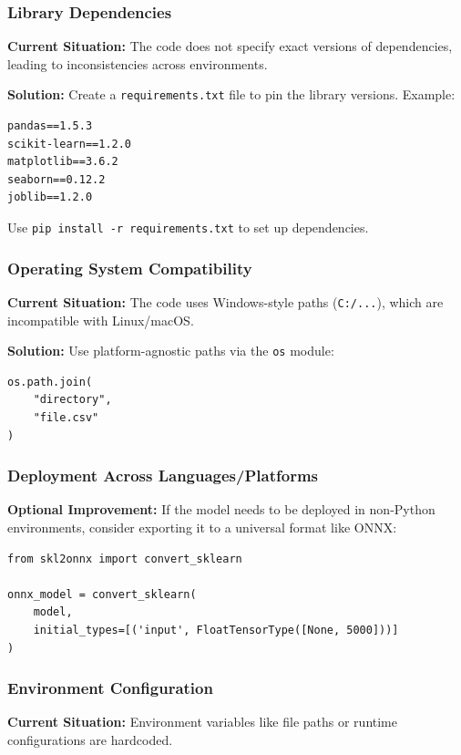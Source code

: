 \documentclass[runningheads,a4paper,11pt]{report}
\begin{document}
\subsubsection{Library Dependencies}
\label{section:library-dependencies}
\textbf{Current Situation:} The code does not specify exact versions of dependencies, leading to inconsistencies across environments.

\textbf{Solution:} Create a \texttt{requirements.txt} file to pin the library versions. Example:
\begin{verbatim}
pandas==1.5.3
scikit-learn==1.2.0
matplotlib==3.6.2
seaborn==0.12.2
joblib==1.2.0
\end{verbatim}
Use \texttt{pip install -r requirements.txt} to set up dependencies.

\subsubsection{Operating System Compatibility}
\label{section:os-comatibility}
\textbf{Current Situation:} The code uses Windows-style paths (\texttt{C:/...}), which are incompatible with Linux/macOS.

\textbf{Solution:} Use platform-agnostic paths via the \texttt{os} module:
\begin{verbatim}
os.path.join(
    "directory", 
    "file.csv"
)
\end{verbatim}

\subsubsection{Deployment Across Languages/Platforms}
\label{section:deployment-across}
\textbf{Optional Improvement:} If the model needs to be deployed in non-Python environments, consider exporting it to a universal format like ONNX:
\begin{verbatim}
from skl2onnx import convert_sklearn

onnx_model = convert_sklearn(
    model, 
    initial_types=[('input', FloatTensorType([None, 5000]))]
)
\end{verbatim}

\subsubsection{Environment Configuration}
\label{section:enviroment-configuration}
\textbf{Current Situation:} Environment variables like file paths or runtime configurations are hardcoded.
\end{document}
